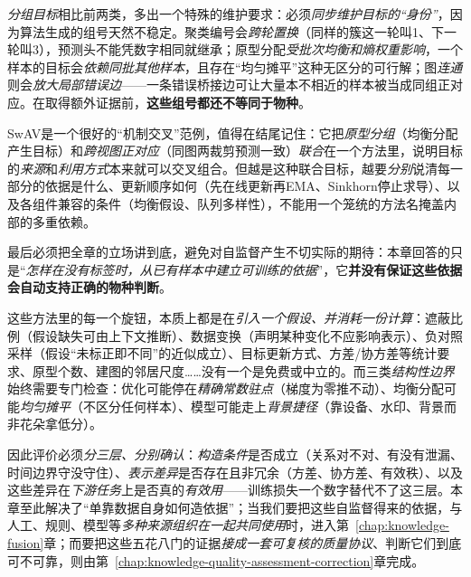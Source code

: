 \emph{分组目标}相比前两类，多出一个特殊的维护要求：必须\emph{同步维护目标的“身份”}，因为算法生成的组号天然不稳定。聚类编号会\emph{跨轮置换}（同样的簇这一轮叫1、下一轮叫3），预测头不能凭数字相同就继承；原型分配\emph{受批次均衡和熵权重影响}，一个样本的目标会\emph{依赖同批其他样本}，且存在“均匀摊平”这种无区分的可行解；图\emph{连通}则会\emph{放大局部错误边}——一条错误桥接边可让大量本不相近的样本被当成同组正对应。在取得额外证据前，\textbf{这些组号都还不等同于物种}。

SwAV是一个很好的“机制交叉”范例，值得在结尾记住：它把\emph{原型分组}（均衡分配产生目标）和\emph{跨视图正对应}（同图两裁剪预测一致）\emph{联合}在一个方法里，说明目标的\emph{来源}和\emph{利用方式}本来就可以交叉组合。但越是这种联合目标，越要\emph{分别}说清每一部分的依据是什么、更新顺序如何（先在线更新再EMA、Sinkhorn停止求导）、以及各组件兼容的条件（均衡假设、队列多样性），不能用一个笼统的方法名掩盖内部的多重依赖。

最后必须把全章的立场讲到底，避免对自监督产生不切实际的期待：本章回答的只是“\emph{怎样在没有标签时，从已有样本中\emph{建立}可训练的依据}”，它\textbf{并没有保证这些依据会自动支持正确的物种判断}。

这些方法里的每一个旋钮，本质上都是在\emph{引入一个假设、并消耗一份计算}：遮蔽比例（假设缺失可由上下文推断）、数据变换（声明某种变化不应影响表示）、负对照采样（假设“未标正即不同”的近似成立）、目标更新方式、方差/协方差等统计要求、原型个数、建图的邻居尺度……没有一个是免费或中立的。而三类\emph{结构性边界}始终需要专门检查：优化可能停在\emph{精确常数驻点}（梯度为零推不动）、均衡分配可能\emph{均匀摊平}（不区分任何样本）、模型可能走上\emph{背景捷径}（靠设备、水印、背景而非花朵拿低分）。

因此评价必须\emph{分三层、分别确认}：\emph{构造条件}是否成立（关系对不对、有没有泄漏、时间边界守没守住）、\emph{表示差异}是否存在且非冗余（方差、协方差、有效秩）、以及这些差异在\emph{下游任务}上是否真的\emph{有效用}——训练损失一个数字替代不了这三层。本章至此解决了“单靠数据自身如何造依据”；当我们要把这些自监督得来的依据，与人工、规则、模型等\emph{多种来源组织在一起共同使用}时，进入第~\ref{chap:knowledge-fusion}章；而要把这些五花八门的证据\emph{接成一套可复核的质量协议}、判断它们到底可不可靠，则由第~\ref{chap:knowledge-quality-assessment-correction}章完成。
